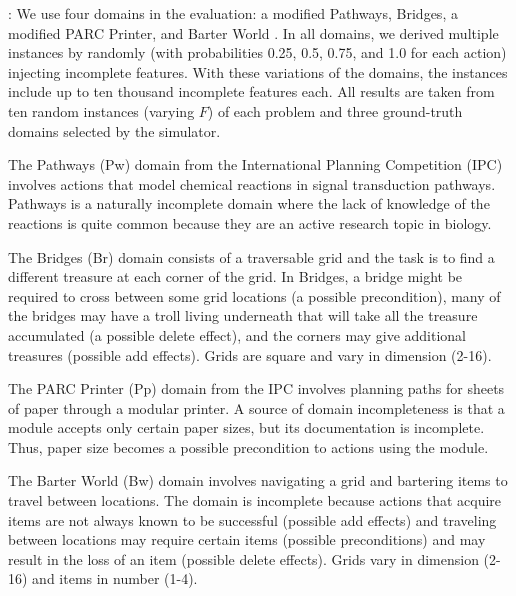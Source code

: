 \documentclass[letterpaper]{article}
\def\und#1{\noindent{\bf #1}:}
\def\citep#1{\cite{#1}}
\begin{document}
\und{Domains} We use four domains in the evaluation: a modified Pathways,
Bridges,  a modified PARC Printer, and Barter World \citep{bryce-icaps11}.  In
all domains, we derived multiple instances by randomly (with probabilities 0.25,
0.5, 0.75, and 1.0 for each action) injecting incomplete  features.   
With these variations of the domains, the instances include up to ten thousand
incomplete  features each. All results are taken from ten random instances
(varying $F$) of each problem and three ground-truth domains selected by the
simulator.

The Pathways (Pw) domain from the International Planning Competition  (IPC) involves actions that model chemical reactions in signal
transduction pathways.  Pathways is a naturally incomplete domain where the lack
of knowledge of the reactions is quite common because they are an active
research topic in biology.  

The Bridges (Br) domain consists of a traversable grid and the task is to find a
different treasure at each corner of the grid. In Bridges,
a bridge might be required  to cross between some grid locations (a possible
precondition), many of the bridges may have a troll living
underneath that will take all the treasure accumulated (a possible delete
effect), and the corners may give additional treasures (possible add
effects).  Grids are square and vary in dimension (2-16).

The PARC Printer (Pp) domain from the IPC involves planning paths for sheets of
paper through a modular printer.  A source of domain incompleteness is that a module
accepts only certain paper sizes, but its documentation is incomplete.  Thus,
paper size becomes a possible precondition to actions using the module.

The Barter World (Bw) domain involves navigating a grid and bartering items to
travel between locations.  The domain is incomplete because actions that acquire
 items are not always known to be successful (possible add effects) and traveling between locations may require
certain items (possible preconditions) and may result in the loss of an item
(possible delete effects). Grids vary in dimension (2-16) and items
in number (1-4).
\end{document}
